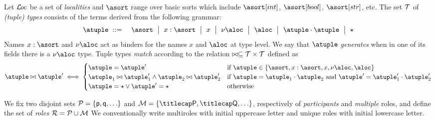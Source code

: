 %
Let $\mathcal{L}\!\mathit{oc}$ be a set of \emph{localities} and $\asort$ range over
basic sorts which include $\asort[int]$, $\asort[bool]$,
$\asort[str]$, etc.
%
The set $\mathcal{T}$ of \emph{(tuple) types} consists of the terms
derived from the following grammar:
\begin{eqnarray*}
  \atuple & \bnfdef & \asort \bnfmid
                      x : \asort \bnfmid
                      x  \bnfmid
                      \nu \aloc \bnfmid
                      \aloc \bnfmid
                      \atuple \cdot \atuple \bnfmid
                      \wildcard
\end{eqnarray*}
Names $x : \asort$ and $\nu \aloc$ act as binders for the names $x$
and $\aloc$ at type level.
%
We say that $\atuple$ \emph{generates} when in one of its fields there
is a $\nu \aloc$ type.
%
Tuple types \emph{match} according to the relation
$\bowtie \subseteq \mathcal{T} \times \mathcal{T}$ defined as
\[
  \atuple \matches \atuple' \iff
  \begin{cases}
    \atuple = \atuple'  
    & 
    \text{if $\atuple\in\{\asort, x : \asort, x, \nu \aloc, \aloc\}$}
    \\
    \atuple_1 \matches \atuple'_1
    \land \atuple_2 \matches \atuple'_2
    &
    \text{if } \atuple = \atuple_1 \cdot \atuple_2
    \text{ and }  \atuple' = \atuple'_1 \cdot \atuple'_2
    \\
    \atuple = \wildcard \vee \atuple' = \wildcard & \text{otherwise}
  \end{cases}
\]

%

We fix two disjoint sets $\participants = \{\ptp p, \ptp q, \ldots\}$
and $\multiroles = \{\amulti P, \amulti Q, \ldots \}$, respectively of
\emph{participants} and \emph{multiple} roles, and define the set of
\emph{roles}
$\mathcal{R} = \mathcal{P} \cup \mathcal{M}$
%
We conventionally write multiroles with initial uppercase letter and
unique roles with initial lowercase letter.
%

